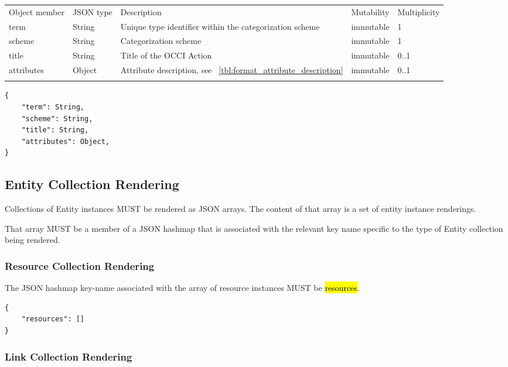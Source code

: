 \documentclass[10pt,a4paper]{article}
\begin{document}
 {
    \begin{tabularx}{\textwidth}{llXll}
    \toprule
    Object member & JSON type & Description & Mutability & Multiplicity \\
    \colrule
    term & String & Unique type identifier within the categorization scheme &
immutable & 1 \\

    scheme & String & Categorization scheme & immutable & 1 \\

    title & String & Title of the OCCI Action & immutable & 0..1 \\

    attributes & Object & Attribute description, see
~\ref{tbl:format_attribute_description} & immutable & 0..1 \\
    \botrule
    \end{tabularx}
}

\begin{lstlisting}
{
    "term": String,
    "scheme": String,
    "title": String,
    "attributes": Object,
}
\end{lstlisting}


\subsection{Entity Collection Rendering}
Collections of Entity instances MUST be rendered as JSON arrays. The content of that array is a set of entity instance renderings.

That array MUST be a member of a JSON hashmap that is associated with the relevant key name specific to the type of Entity collection being rendered.

\subsubsection{Resource Collection Rendering}

The JSON hashmap key-name associated with the array of resource instances MUST be \hl{resources}.

\begin{lstlisting}
{
    "resources": []
}
\end{lstlisting}

\subsubsection{Link Collection Rendering}
\end{document}
